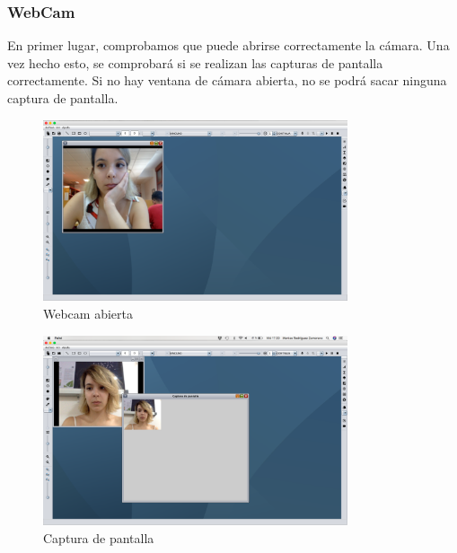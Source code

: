 \subsubsection{WebCam}
En primer lugar, comprobamos que puede abrirse correctamente la cámara. Una vez hecho esto, se comprobará si se realizan las capturas de pantalla correctamente. Si no hay ventana de cámara abierta, no se podrá sacar ninguna captura de pantalla.
\vskip0.3cm
\begin{figure}[H]
 \centering
  \includegraphics[width=0.8\textwidth]{video/webcam.jpg}
 \caption{Webcam abierta}
 \label{diseño}
 \end{figure}
 \vskip0.3cm
\begin{figure}[H]
 \centering
  \includegraphics[width=0.8\textwidth]{video/captura.jpg}
 \caption{Captura de pantalla}
 \label{diseño}
 \end{figure}




